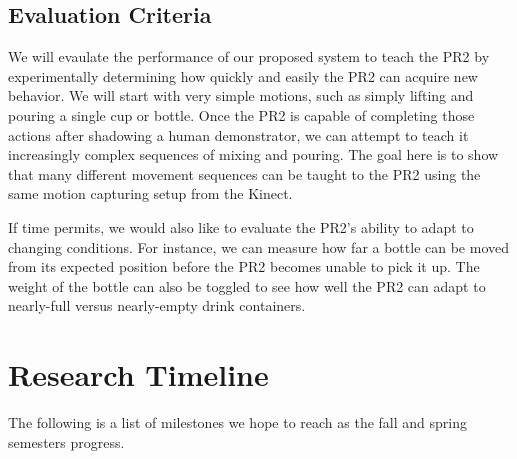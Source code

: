 \documentclass{sig-alternate}
\begin{document}
\subsection{Evaluation Criteria}
\label{subsec:eval_criteria}
We will evaulate the performance of our proposed system to teach the PR2 by experimentally determining how quickly and easily the PR2
can acquire new behavior. We will start with very simple motions, such as simply lifting and pouring a single cup or bottle. Once the PR2 is capable of completing those actions after shadowing a human demonstrator, we can attempt to teach it increasingly complex sequences of mixing and pouring. The goal here is to show that many different movement sequences can be taught to the PR2 using the same motion capturing setup from the Kinect.

If time permits, we would also like to evaluate the PR2's ability to adapt to changing conditions. For instance, we can measure how far a bottle can be moved from its expected position before the PR2 becomes unable to pick it up. The weight of the bottle can also be toggled to see how well the PR2 can adapt to nearly-full versus nearly-empty drink containers.

\section{Research Timeline}
\label{sec:research_timeline}
The following is a list of milestones we hope to reach as the fall and spring semesters progress. 
\end{document}
